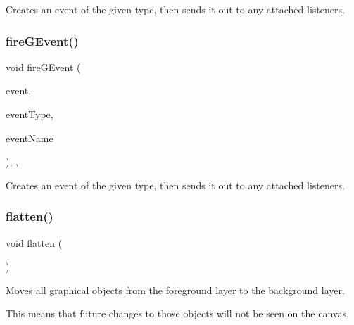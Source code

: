 Creates an event of the given type, then sends it out to any attached listeners. 

\mbox{\label{classGObservable_a2a70a7d7435ff0c3b80bb4d70da19e0d}} 
\subsubsection{\texorpdfstring{fire\+G\+Event()}{fireGEvent()}\hspace{0.1cm}{\footnotesize\ttfamily [8/8]}}
{\footnotesize\ttfamily void fire\+G\+Event (\begin{DoxyParamCaption}\item[{Q\+Window\+State\+Change\+Event $\ast$}]{event,  }\item[{Event\+Type}]{event\+Type,  }\item[{const std\+::string \&}]{event\+Name }\end{DoxyParamCaption})\hspace{0.3cm}{\ttfamily [protected]}, {\ttfamily [virtual]}, {\ttfamily [inherited]}}



Creates an event of the given type, then sends it out to any attached listeners. 

\mbox{\label{classGCanvas_a4c4590df33ce47ad8a42e06f9f44fc93}} 
\subsubsection{\texorpdfstring{flatten()}{flatten()}}
{\footnotesize\ttfamily void flatten (\begin{DoxyParamCaption}{ }\end{DoxyParamCaption})\hspace{0.3cm}{\ttfamily [virtual]}}



Moves all graphical objects from the foreground layer to the background layer. 

This means that future changes to those objects will not be seen on the canvas. \mbox{\label{classGCanvas_a46b18491b5230c765fbd9b8c7a095587}} 
